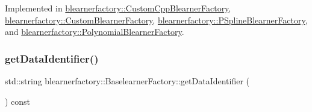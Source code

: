 Implemented in \hyperlink{classblearnerfactory_1_1_custom_cpp_blearner_factory_a29cc0d142660d6e52245c264f71dd651}{blearnerfactory\+::\+Custom\+Cpp\+Blearner\+Factory}, \hyperlink{classblearnerfactory_1_1_custom_blearner_factory_a53db4c5d9eb3875241bb47a8d73744e2}{blearnerfactory\+::\+Custom\+Blearner\+Factory}, \hyperlink{classblearnerfactory_1_1_p_spline_blearner_factory_a9363131f08b3b3c1c482786347d13f7c}{blearnerfactory\+::\+P\+Spline\+Blearner\+Factory}, and \hyperlink{classblearnerfactory_1_1_polynomial_blearner_factory_addce36fbb590b2cd3d9325b53ae74566}{blearnerfactory\+::\+Polynomial\+Blearner\+Factory}.

\mbox{\label{classblearnerfactory_1_1_baselearner_factory_a40703963bb3fd273b835a99263d9b599}} 
\subsubsection{\texorpdfstring{get\+Data\+Identifier()}{getDataIdentifier()}}
{\footnotesize\ttfamily std\+::string blearnerfactory\+::\+Baselearner\+Factory\+::get\+Data\+Identifier (\begin{DoxyParamCaption}{ }\end{DoxyParamCaption}) const}

